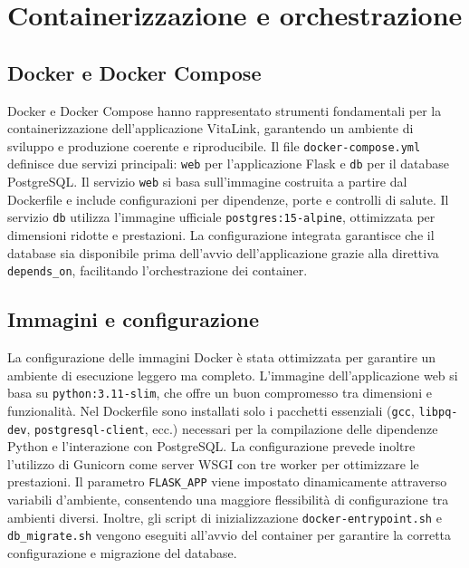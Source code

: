 \documentclass[12pt,a4paper,oneside]{report}
\begin{document}
\section{Containerizzazione e orchestrazione}
\subsection{Docker e Docker Compose}
Docker e Docker Compose hanno rappresentato strumenti fondamentali per la containerizzazione dell'applicazione VitaLink, garantendo un ambiente di sviluppo e produzione coerente e riproducibile. Il file \texttt{docker-compose.yml} definisce due servizi principali: \texttt{web} per l'applicazione Flask e \texttt{db} per il database PostgreSQL. Il servizio \texttt{web} si basa sull'immagine costruita a partire dal Dockerfile e include configurazioni per dipendenze, porte e controlli di salute. Il servizio \texttt{db} utilizza l'immagine ufficiale \texttt{postgres:15-alpine}, ottimizzata per dimensioni ridotte e prestazioni. La configurazione integrata garantisce che il database sia disponibile prima dell'avvio dell'applicazione grazie alla direttiva \texttt{depends\_on}, facilitando l'orchestrazione dei container.

\subsection{Immagini e configurazione}
La configurazione delle immagini Docker è stata ottimizzata per garantire un ambiente di esecuzione leggero ma completo. L'immagine dell'applicazione web si basa su \texttt{python:3.11-slim}, che offre un buon compromesso tra dimensioni e funzionalità. Nel Dockerfile sono installati solo i pacchetti essenziali (\texttt{gcc}, \texttt{libpq-dev}, \texttt{postgresql-client}, ecc.) necessari per la compilazione delle dipendenze Python e l'interazione con PostgreSQL. La configurazione prevede inoltre l'utilizzo di Gunicorn come server WSGI con tre worker per ottimizzare le prestazioni. Il parametro \texttt{FLASK\_APP} viene impostato dinamicamente attraverso variabili d'ambiente, consentendo una maggiore flessibilità di configurazione tra ambienti diversi. Inoltre, gli script di inizializzazione \texttt{docker-entrypoint.sh} e \texttt{db\_migrate.sh} vengono eseguiti all'avvio del container per garantire la corretta configurazione e migrazione del database.
\end{document}

